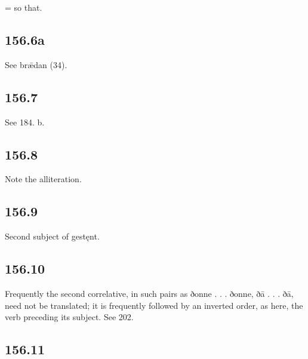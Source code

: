 = so that.

\subsection*{156.6a}

See brǣdan (34).

\subsection*{156.7}

See 184. b.

\subsection*{156.8}

Note the alliteration.

\subsection*{156.9}

Second subject of gestęnt.

\subsection*{156.10}

Frequently the second correlative, in such pairs as ðonne . . . ðonne, ðā . . . ðā, need not be translated; it is frequently followed by an inverted order, as here, the verb preceding its subject. See 202.

\subsection*{156.11}

